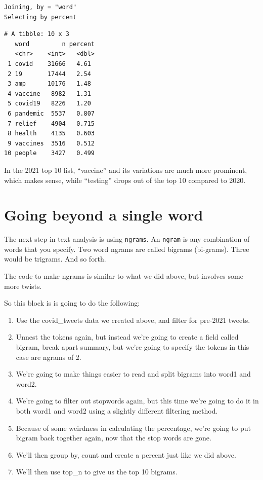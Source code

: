 \documentclass[
  letterpaper,
  DIV=11,
  numbers=noendperiod]{scrreprt}
\providecommand{\tightlist}{%
  \setlength{\itemsep}{0pt}\setlength{\parskip}{0pt}}\usepackage{longtable,booktabs,array}
\begin{document}
\begin{verbatim}
Joining, by = "word"
Selecting by percent
\end{verbatim}

\begin{verbatim}
# A tibble: 10 x 3
   word         n percent
   <chr>    <int>   <dbl>
 1 covid    31666   4.61 
 2 19       17444   2.54 
 3 amp      10176   1.48 
 4 vaccine   8982   1.31 
 5 covid19   8226   1.20 
 6 pandemic  5537   0.807
 7 relief    4904   0.715
 8 health    4135   0.603
 9 vaccines  3516   0.512
10 people    3427   0.499
\end{verbatim}

In the 2021 top 10 list, ``vaccine'' and its variations are much more
prominent, which makes sense, while ``testing'' drops out of the top 10
compared to 2020.

\hypertarget{going-beyond-a-single-word}{%
\section{Going beyond a single word}\label{going-beyond-a-single-word}}

The next step in text analysis is using \texttt{ngrams}. An
\texttt{ngram} is any combination of words that you specify. Two word
ngrams are called bigrams (bi-grams). Three would be trigrams. And so
forth.

The code to make ngrams is similar to what we did above, but involves
some more twists.

So this block is is going to do the following:

\begin{enumerate}
\def\labelenumi{\arabic{enumi}.}
\tightlist
\item
  Use the covid\_tweets data we created above, and filter for pre-2021
  tweets.
\item
  Unnest the tokens again, but instead we're going to create a field
  called bigram, break apart summary, but we're going to specify the
  tokens in this case are ngrams of 2.
\item
  We're going to make things easier to read and split bigrams into word1
  and word2.
\item
  We're going to filter out stopwords again, but this time we're going
  to do it in both word1 and word2 using a slightly different filtering
  method.
\item
  Because of some weirdness in calculating the percentage, we're going
  to put bigram back together again, now that the stop words are gone.
\item
  We'll then group by, count and create a percent just like we did
  above.
\item
  We'll then use top\_n to give us the top 10 bigrams.
\end{enumerate}
\end{document}
